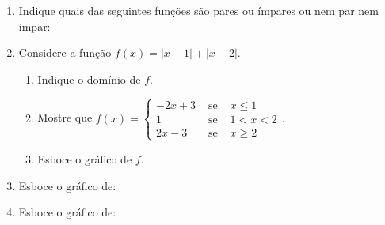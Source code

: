 \begin{enumerate}
\item Indique quais das seguintes funções são pares ou ímpares
ou nem par nem impar:
\begin{enumerate}
\end{enumerate}

\item Considere a função $f(x)=|x-1|+|x-2|.$
\begin{enumerate}
\item Indique o domínio de $f$.
\item Mostre que $f(x)=\left\{\begin{array}{lcl}
         -2x+3   & \mbox{ se } & x\leq 1    \\
         1 		 & \mbox{ se } & 1<x<2\\
         2x-3 	 & \mbox{ se } & x\geq 2
       \end{array}
\right..$
\item Esboce o gráfico de $f$.
\end{enumerate}



\item Esboce o gráfico de:
\begin{enumerate}
\end{enumerate}

\item Esboce o gráfico de:
\begin{enumerate}
\end{enumerate}


\end{enumerate}
